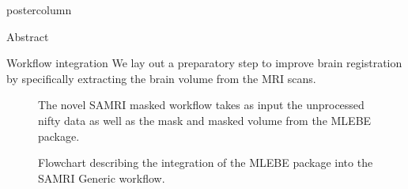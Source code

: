     \begin{frame}
        \vspace{2cm}
        \begin{columns}
            \begin{column}{.42\textwidth}
                \begin{beamercolorbox}[center]{postercolumn}
                    \begin{minipage}{.98\textwidth}  %
                        \parbox[t][\columnheight]{\textwidth}{ %
                            \begin{myblock}{Abstract}
                                
                            \end{myblock}\vfill
                            \vspace{-0.3em}
                            \begin{myblock}{Workflow integration}
                                We lay out a preparatory step to improve brain registration by specifically extracting the brain volume from the MRI scans.
                                \begin{figure}
                                    \centering
                                    \caption{The novel SAMRI masked workflow takes as input the unprocessed nifty data as well as the mask and masked volume from the \textcolor{lg}{MLEBE} \cite{mlebe} package.}
                                \end{figure}
                                \begin{figure}
                                    \centering
                                    \caption{Flowchart describing the integration of the \textcolor{lg}{MLEBE} \cite{mlebe} package into the \textcolor{lg}{SAMRI} \cite{noauthor_ibt-fmi/samri_2019} Generic workflow.}
                                \end{figure}
                            \end{myblock}\vfill

}
\end{minipage}
\end{beamercolorbox}
\end{column}
\end{columns}
\end{frame}
